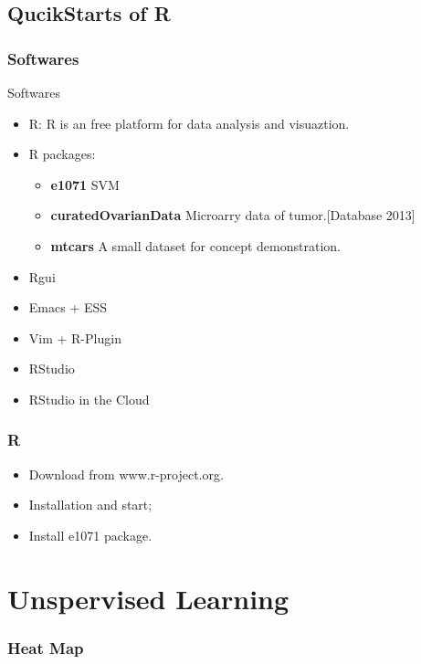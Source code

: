 \documentclass[UTF8]{beamer}\usepackage[]{graphicx}\usepackage[]{color}
\makeatletter
\newenvironment{kframe}{%
 \def\at@end@of@kframe{}%
 \ifinner\ifhmode%
  \def\at@end@of@kframe{\end{minipage}}%
  \begin{minipage}{\columnwidth}%
 \fi\fi%
 \def\FrameCommand##1{\hskip\@totalleftmargin \hskip-\fboxsep
 \colorbox{shadecolor}{##1}\hskip-\fboxsep
     \hskip-\linewidth \hskip-\@totalleftmargin \hskip\columnwidth}%
 \MakeFramed {\advance\hsize-\width
   \@totalleftmargin\z@ \linewidth\hsize
   \@setminipage}}%
 {\par\unskip\endMakeFramed%
 \at@end@of@kframe}
\newenvironment{knitrout}{}{} %
\makeatother
\begin{document}
\subsection{QucikStarts of R}
\begin{frame}
  \frametitle{Softwares}
  \begin{block}{Softwares}
\begin{itemize}
\item R: R is an free platform for data analysis and visuaztion.
\item R packages:
\begin{itemize}
\item \textbf{e1071} SVM
\item \textbf{curatedOvarianData} Microarry data of tumor.[Database 2013]
\item \textbf{mtcars} A small dataset for concept demonstration.
\end{itemize}
\item Rgui
\item Emacs + ESS
\item Vim + R-Plugin
\item RStudio
\item RStudio in the Cloud
\end{itemize}
  \end{block}
\end{frame}

\begin{frame}
  \frametitle{R}
\begin{itemize}
  \item Download from www.r-project.org.
  \item Installation and start;
  \item Install e1071 package.
\end{itemize}
\end{frame}

\section{Unspervised Learning}

\begin{frame}[fragile]
  \frametitle{Heat Map}

\begin{knitrout}
\color{fgcolor}\begin{kframe}


{\ttfamily\noindent\bfseries\color{errorcolor}{\#\# Error in library(colorRamps): there is no package called 'colorRamps'}}

{\ttfamily\noindent\bfseries{}}\end{kframe}
\end{knitrout}
\end{frame}
\end{document}
